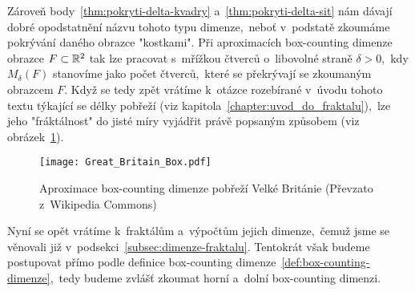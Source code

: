 Zároveň body~\ref{thm:pokryti-delta-kvadry} a~\ref{thm:pokryti-delta-sit} nám dávají dobré opodstatnění názvu tohoto typu dimenze,~neboť v~podstatě zkoumáme pokrývání daného obrazce "kostkami". Při aproximacích box-counting dimenze obrazce $F\subset\mathbb{R}^2$ tak lze pracovat s~mřížkou čtverců o~libovolné straně $\delta>0$,~kdy $M_\delta(F)$ stanovíme jako počet čtverců,~které se překrývají se zkoumaným obrazcem $F$. Když se tedy zpět vrátíme k~otázce rozebírané v~úvodu tohoto textu týkající se délky pobřeží (viz kapitola~\ref{chapter:uvod_do_fraktalu}),~lze jeho "fráktálnost" do jisté míry vyjádřit právě popsaným způsobem (viz obrázek~\ref{fig:aproximace-delky-pobrezi-vb}).
\begin{figure}
    \centering
    \texttt{[image: Great\_Britain\_Box.pdf]}
    \caption[Aproximace box-counting dimenze pobřeží Velké Británie]{Aproximace box-counting dimenze pobřeží Velké Británie (Převzato z~Wikipedia Commons)\footnotemark}
    \label{fig:aproximace-delky-pobrezi-vb}
\end{figure}
Nyní se opět vrátíme k~fraktálům a~výpočtům jejich dimenze,~čemuž jsme se věnovali již v~podsekci~\ref{subsec:dimenze-fraktalu}. Tentokrát však budeme postupovat přímo podle definice box-counting dimenze~\ref{def:box-counting-dimenze},~tedy budeme zvlášť zkoumat horní a~dolní box-counting dimenzi.
